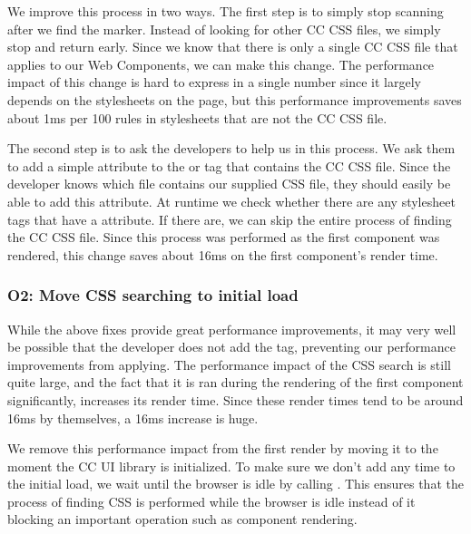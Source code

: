 We improve this process in two ways. The first step is to simply stop scanning after we find the marker. Instead of looking for other CC CSS files, we simply stop and return early. Since we know that there is only a single CC CSS file that applies to our Web Components, we can make this change. The performance impact of this change is hard to express in a single number since it largely depends on the stylesheets on the page, but this performance improvements saves about 1ms per 100 rules in stylesheets that are not the CC CSS file.

The second step is to ask the developers to help us in this process. We ask them to add a simple  attribute to the  or  tag that contains the CC CSS file. Since the developer knows which file contains our supplied CSS file, they should easily be able to add this attribute. At runtime we check whether there are any stylesheet tags that have a  attribute. If there are, we can skip the entire process of finding the CC CSS file. Since this process was performed as the first component was rendered, this change saves about 16ms on the first component's render time.

\subsubsection{O2: Move CSS searching to initial load}\label{sec:case-study:css-initial-load}
While the above fixes provide great performance improvements, it may very well be possible that the developer does not add the  tag, preventing our performance improvements from applying. The performance impact of the CSS search is still quite large, and the fact that it is ran during the rendering of the first component significantly, increases its render time. Since these render times tend to be around 16ms by themselves, a 16ms increase is huge.

We remove this performance impact from the first render by moving it to the moment the CC UI library is initialized. To make sure we don't add any time to the initial load, we wait until the browser is idle by calling . This ensures that the process of finding CSS is performed while the browser is idle instead of it blocking an important operation such as component rendering.
